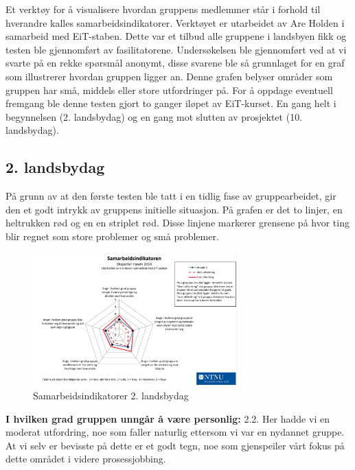 Et verktøy for å visualisere hvordan gruppens medlemmer står i forhold til hverandre kalles samarbeidsindikatorer. 
Verktøyet er utarbeidet av Are Holden i samarbeid med EiT-staben. 
Dette var et tilbud alle gruppene i landsbyen fikk og testen ble gjennomført av fasilitatorene. 
Undersøkelsen ble gjennomført ved at vi svarte på en rekke spørsmål anonymt, disse svarene ble så grunnlaget for en graf som illustrerer hvordan gruppen ligger an.
Denne grafen belyser områder som gruppen har små, middels eller store utfordringer på. 
For å oppdage eventuell fremgang ble denne testen gjort to ganger iløpet av EiT-kurset. En gang helt i begynnelsen (2. landsbydag) og en gang mot slutten av prosjektet (10. landsbydag). 

\subsection{2. landsbydag}
På grunn av at den første testen ble tatt i en tidlig fase av gruppearbeidet, gir den et godt intrykk av gruppens initielle situasjon. 
På grafen er det to linjer, en heltrukken rød og en en striplet rød. 
Disse linjene markerer grensene på hvor ting blir regnet som store problemer og små problemer. 
\begin{figure}[H]
    \centering
    \includegraphics[width=0.7\textwidth]{images/samarbeidsindikator1.jpeg} 
    \caption{Samarbeidsindikatorer 2. landsbydag}
    \label{fig:sam1}
\end{figure}

\noindent \textbf{I hvilken grad gruppen unngår å være personlig:} 2.2.
\newline
\noindent Her hadde vi en moderat utfordring, noe som faller naturlig ettersom vi var en nydannet gruppe.
 At vi selv er bevisste på dette er et godt tegn, noe som gjenspeiler vårt fokus på dette området i videre prosessjobbing.
\vspace{\secspace}

